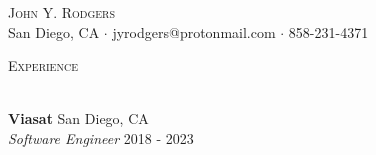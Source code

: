 \documentclass[a4paper]{article}
\newcommand{\lineunder} {
    \vspace*{-8pt} \\
    \hspace*{-18pt} \hrulefill \\
}
\newcommand{\header} [1] {
    {\hspace*{-18pt}\vspace*{6pt} \textsc{#1}}
    \vspace*{-6pt} \lineunder
}
\begin{document}
\vspace*{-40pt}



\vspace*{-10pt}
\begin{center}
	{\Huge \scshape {John Y. Rodgers}}\\
	San Diego, CA $\cdot$ jyrodgers@protonmail.com $\cdot$ 858-231-4371 \\
\end{center}

\header{Experience}
\vspace{1mm}

\textbf{Viasat} \hfill San Diego, CA\\
\textit{Software Engineer} \hfill 2018 - 2023\\
\vspace{-1mm}
\end{document}
